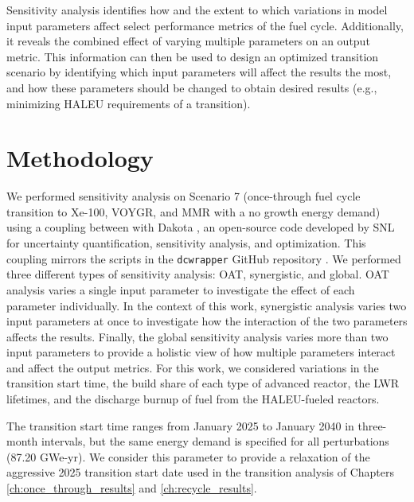 Sensitivity analysis identifies how and the extent to which variations 
in model input parameters affect select performance 
metrics of the fuel cycle. Additionally, it reveals the combined effect 
of varying multiple parameters on 
an output metric. This information can then be used to design 
an optimized transition scenario by identifying which input parameters 
will affect the results the most, and how these parameters should be 
changed to obtain desired results (e.g., minimizing \gls{HALEU} requirements
of a transition). 

\section{Methodology}
We performed sensitivity analysis on Scenario 7 (once-through fuel cycle 
transition to Xe-100, VOYGR, and \gls{MMR} with a no growth energy demand) 
using a coupling between \Cyclus with Dakota \cite{adams_dakota_2021}, an 
open-source code developed by \acrfull{SNL} for uncertainty quantification, 
sensitivity analysis, and optimization. This coupling mirrors  
the scripts in the \texttt{dcwrapper} GitHub repository 
\cite{chee_arfcdcwrapper_2019}. We performed three different types 
of sensitivity analysis: \acrfull{OAT}, synergistic, 
and global. \gls{OAT} analysis varies a single input parameter to 
investigate the effect of each parameter individually. In the context of 
this work, synergistic 
analysis varies two input parameters at once to investigate how the 
interaction of the two parameters affects the results. Finally, the global 
sensitivity
analysis varies more than two input parameters to provide a holistic 
view of how multiple parameters interact and affect the output metrics. 
For this work, we considered variations in the transition 
start time, the build share of each type of advanced reactor, 
the \gls{LWR} lifetimes, and the discharge burnup of fuel from the 
\gls{HALEU}-fueled reactors. 

The transition start time ranges from January 
2025 to January 2040 in three-month intervals, but the same energy demand 
is specified for all perturbations (87.20 GWe-yr). We consider this parameter 
to provide a relaxation of the aggressive 2025 transition start date 
used in the transition analysis of Chapters \ref{ch:once_through_results} and
\ref{ch:recycle_results}.

